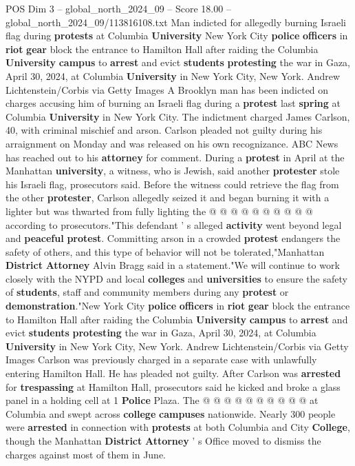 \begin{textsample}{POS Dim 3 – global\_north\_2024\_09 – Score 18.00 – global\_north\_2024\_09/113816108.txt}  \label{ex:f3_pos_166}
Man indicted for allegedly burning Israeli flag during \textbf{protests} at Columbia \textbf{University} New York City \textbf{police} \textbf{officers} in \textbf{riot} \textbf{gear} block the entrance to Hamilton Hall after raiding the Columbia \textbf{University} \textbf{campus} to \textbf{arrest} and evict \textbf{students} \textbf{protesting} the war in Gaza, April 30, 2024, at Columbia \textbf{University} in New York City, New York.
Andrew Lichtenstein/Corbis via Getty Images A Brooklyn man has been indicted on charges accusing him of burning an Israeli flag during a \textbf{protest} last \textbf{spring} at Columbia \textbf{University} in New York City.
The indictment charged James Carlson, 40, with criminal mischief and arson.
Carlson pleaded not guilty during his arraignment on Monday and was released on his own recognizance.
ABC News has reached out to his \textbf{attorney} for comment.
During a \textbf{protest} in April at the Manhattan \textbf{university}, a witness, who is Jewish, said another \textbf{protester} stole his Israeli flag, prosecutors said.
Before the witness could retrieve the flag from the other \textbf{protester}, Carlson allegedly seized it and began burning it with a lighter but was thwarted from fully lighting the @ @ @ @ @ @ @ @ @ @ according to prosecutors."This defendant ' s alleged \textbf{activity} went beyond legal and \textbf{peaceful} \textbf{protest}.
Committing arson in a crowded \textbf{protest} endangers the safety of others, and this type of behavior will not be tolerated,"Manhattan \textbf{District} \textbf{Attorney} Alvin Bragg said in a statement."We will continue to work closely with the NYPD and local \textbf{colleges} and \textbf{universities} to ensure the safety of \textbf{students}, staff and community members during any \textbf{protest} or \textbf{demonstration}."New York City \textbf{police} \textbf{officers} in \textbf{riot} \textbf{gear} block the entrance to Hamilton Hall after raiding the Columbia \textbf{University} \textbf{campus} to \textbf{arrest} and evict \textbf{students} \textbf{protesting} the war in Gaza, April 30, 2024, at Columbia \textbf{University} in New York City, New York.
Andrew Lichtenstein/Corbis via Getty Images Carlson was previously charged in a separate case with unlawfully entering Hamilton Hall.
He has pleaded not guilty.
After Carlson was \textbf{arrested} for \textbf{trespassing} at Hamilton Hall, prosecutors said he kicked and broke a glass panel in a holding cell at 1 \textbf{Police} Plaza.
The @ @ @ @ @ @ @ @ @ @ at Columbia and swept across \textbf{college} \textbf{campuses} nationwide.
Nearly 300 people were \textbf{arrested} in connection with \textbf{protests} at both Columbia and City \textbf{College}, though the Manhattan \textbf{District} \textbf{Attorney} ' s Office moved to dismiss the charges against most of them in June.

\end{textsample}
